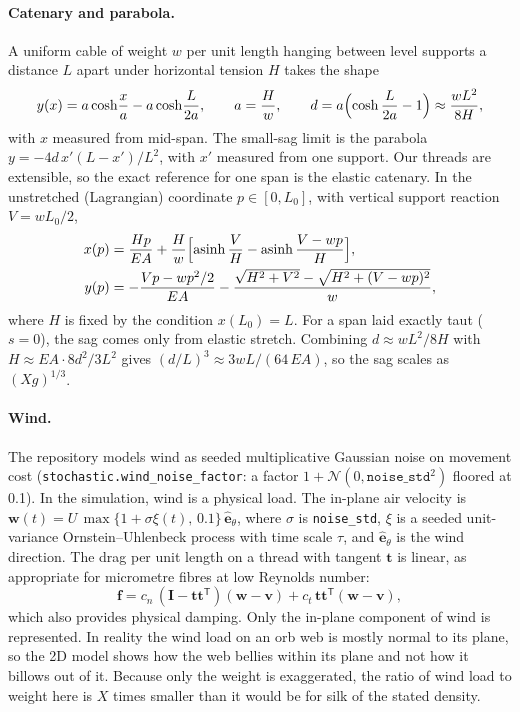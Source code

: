 \paragraph{Catenary and parabola.}
A uniform cable of weight $w$ per unit length hanging between level supports a distance $L$ apart under horizontal
tension $H$ takes the shape
\begin{equation}
  y(x) = a\cosh\!\frac{x}{a} - a\cosh\!\frac{L}{2a}, \qquad a = \frac{H}{w}, \qquad
  d = a\Bigl(\cosh\frac{L}{2a}-1\Bigr) \approx \frac{wL^2}{8H},
  \label{eq:sim-catenary}
\end{equation}
with $x$ measured from mid-span. The small-sag limit is the parabola $y = -4d\,x'(L-x')/L^2$, with $x'$ measured from
one support. Our threads are extensible, so the exact reference for one span is the elastic catenary. In the
unstretched (Lagrangian) coordinate $p\in[0,L_0]$, with vertical support reaction $V = wL_0/2$,
\begin{equation}
  \begin{aligned}
  x(p) &= \frac{Hp}{EA} + \frac{H}{w}\Bigl[\operatorname{asinh}\frac{V}{H} - \operatorname{asinh}\frac{V-wp}{H}\Bigr],\\
  y(p) &= -\frac{Vp - wp^2/2}{EA} - \frac{\sqrt{H^2+V^2} - \sqrt{H^2+(V-wp)^2}}{w},
  \end{aligned}
  \label{eq:sim-elastic}
\end{equation}
where $H$ is fixed by the condition $x(L_0)=L$. For a span laid exactly taut ($s=0$), the sag comes only from elastic
stretch. Combining $d \approx wL^2/8H$ with $H \approx EA\cdot 8d^2/3L^2$ gives $(d/L)^3 \approx 3wL/(64\,EA)$, so
the sag scales as $(Xg)^{1/3}$.

\paragraph{Wind.}
The repository models wind as seeded multiplicative Gaussian noise on movement cost (\texttt{stochastic.wind\_noise\_factor}:
a factor $1+\mathcal N(0,\texttt{noise\_std}^2)$ floored at 0.1). In the simulation, wind is a physical load. The
in-plane air velocity is $\mathbf w(t) = U\,\max\{1+\sigma\xi(t),\,0.1\}\,\hat{\mathbf e}_\theta$, where $\sigma$ is
\texttt{noise\_std}, $\xi$ is a seeded unit-variance Ornstein--Uhlenbeck process with time scale $\tau$, and
$\hat{\mathbf e}_\theta$ is the wind direction. The drag per unit length on a thread with tangent $\mathbf t$ is linear,
as appropriate for micrometre fibres at low Reynolds number:
\begin{equation}
  \mathbf f = c_n\,(\mathbf I - \mathbf t\mathbf t^{\mathsf T})(\mathbf w - \mathbf v) + c_t\,\mathbf t\mathbf t^{\mathsf T}(\mathbf w - \mathbf v),
  \label{eq:sim-drag}
\end{equation}
which also provides physical damping. Only the in-plane component of wind is represented. In reality the wind load on
an orb web is mostly normal to its plane, so the 2D model shows how the web bellies within its plane and not how it
billows out of it. Because only the weight is exaggerated, the ratio of wind load to weight here is $X$ times smaller
than it would be for silk of the stated density.

